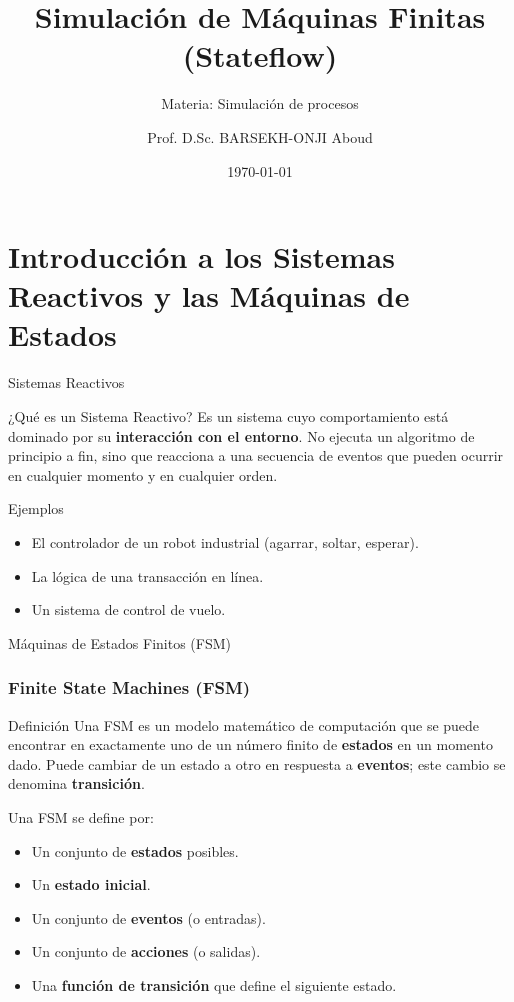 \documentclass[aspectratio=169,xcolor=dvipsnames]{beamer}
\title{Simulación de Máquinas Finitas (Stateflow)}
\subtitle{Materia: Simulación de procesos}
\author{Prof. D.Sc. BARSEKH-ONJI Aboud}
\institute
{
    Facultad de Ingeniería \\
    Universidad Anáhuac México %
}
\date{\today} %
\begin{document}
\begin{frame}
    \titlepage
\end{frame}

\section{Introducción a los Sistemas Reactivos y las Máquinas de Estados}

\begin{frame}{Sistemas Reactivos}
    \begin{block}{¿Qué es un Sistema Reactivo?}
    Es un sistema cuyo comportamiento está dominado por su \textbf{interacción con el entorno}. No ejecuta un algoritmo de principio a fin, sino que reacciona a una secuencia de eventos que pueden ocurrir en cualquier momento y en cualquier orden.
    \end{block}
    
    \begin{alertblock}{Ejemplos}
        \begin{itemize}
            \item El controlador de un robot industrial (agarrar, soltar, esperar).
            \item La lógica de una transacción en línea.
            \item Un sistema de control de vuelo.
        \end{itemize}
    \end{alertblock}
\end{frame}


\begin{frame}{Máquinas de Estados Finitos (FSM)}
    \frametitle{Finite State Machines (FSM)}
    \begin{block}{Definición}
    Una FSM es un modelo matemático de computación que se puede encontrar en exactamente uno de un número finito de \textbf{estados} en un momento dado. Puede cambiar de un estado a otro en respuesta a \textbf{eventos}; este cambio se denomina \textbf{transición}.
    \end{block}

    Una FSM se define por:
    \begin{itemize}
        \item Un conjunto de \textbf{estados} posibles.
        \item Un \textbf{estado inicial}.
        \item Un conjunto de \textbf{eventos} (o entradas).
        \item Un conjunto de \textbf{acciones} (o salidas).
        \item Una \textbf{función de transición} que define el siguiente estado.
    \end{itemize}
\end{frame}
\end{document}
